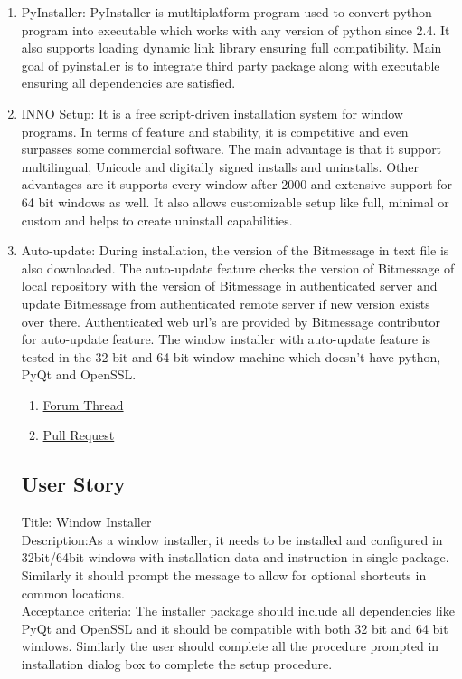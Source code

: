 \documentclass[12pt]{article}
\begin{document}
\begin{enumerate}
\\
\item PyInstaller: 
PyInstaller is mutltiplatform program used to convert python program into executable which works with any version of python since 2.4. It also supports loading dynamic link library ensuring full compatibility. Main goal of pyinstaller is to integrate third party package along with executable ensuring all dependencies are satisfied.\\
\item INNO Setup:
 It is a free script-driven installation system for window programs. In terms of feature and stability, it is competitive and even surpasses some commercial software. The main advantage is that it support multilingual, Unicode and digitally signed installs and uninstalls. Other advantages are it supports every window after 2000 and extensive support for 64 bit windows as well. It also allows customizable setup like full, minimal or custom and helps to create uninstall capabilities.\\
 \item Auto-update: 
During installation, the version of the Bitmessage in text file is also downloaded. 
The auto-update feature checks the version of Bitmessage of local repository with the version of Bitmessage in authenticated server and update Bitmessage from authenticated remote server if new version exists over there. Authenticated web url’s are provided by Bitmessage contributor for auto-update feature. The window installer with auto-update feature is tested in the 32-bit and 64-bit window machine which doesn’t have python, PyQt and OpenSSL.
\begin{enumerate}
 \item \href{https://bitmessage.org/forum/index.php?topic=3316.msg6986#msg6986.html}{Forum Thread} 
 \item \href{https://github.com/Bitmessage/PyBitmessage/pull/585}{Pull Request} \end{enumerate}

\subsection{User Story}

Title: Window Installer\\
Description:As a window installer, it needs to be installed and configured in 32bit/64bit windows with
installation data and instruction in single package.
Similarly it should prompt the message to allow for optional shortcuts in common locations.\\
Acceptance criteria:
The installer package should include all dependencies like PyQt and OpenSSL and it should be compatible with both 32 bit and 64 bit windows. Similarly the user should complete all the procedure prompted in installation dialog box to complete the setup procedure.\\


\end{enumerate}
\end{document}
